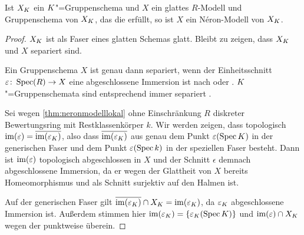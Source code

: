 \begin{Lemma}\label{nerongruppenschemaglatt}
  Ist $X_{K}$ ein $K$"=Gruppenschema und $X$ ein
  glattes $R$-Modell und Gruppenschema von $X_{K}$, das die
  \NAbbEig erfüllt, so ist $X$ ein Néron-Modell von $X_{K}$.
  \begin{proof}
    $X_{K}$ ist als Faser eines glatten Schemas glatt. Bleibt zu
    zeigen, dass $X_{K}$ und $X$ separiert sind.
    
    Ein Gruppenschema $X$ ist genau dann separiert, wenn der
    Einheitsschnitt ${\varepsilon\colon\operatorname{Spec}(R)\to X}$ eine abgeschlossene
    Immersion ist nach
    \cite[Lemma 38.6.1]{stacksproject} oder \cite[7.1, Lemma 2]{neron}.
    $K$"=Gruppenschemata sind entsprechend immer separiert
    \cite[Lemma 38.7.3]{stacksproject}. 

    Sei wegen \ref{thm:neronmodelllokal} ohne Einschränkung $R$ diskreter
    Bewertungsring mit Restklassenkörper $k$.    
    Wir werden zeigen, dass topologisch
    $\operatorname{im}(\varepsilon)=\overline{\operatorname{im}(\varepsilon_{K})}$,
    also dass $\overline{\operatorname{im}(\varepsilon_{K})}$ aus genau dem Punkt
    $\varepsilon(\operatorname{Spec}K)$ in der generischen Faser und dem Punkt
    $\varepsilon(\operatorname{Spec} k)$ in der speziellen Faser besteht.
    Dann ist $\operatorname{im}(\varepsilon)$ topologisch abgeschlossen in $X$ und der
    Schnitt $\epsilon$ demnach abgeschlossene Immersion, da er
    wegen der Glattheit von $X$ bereits Homeomorphismus und als
    Schnitt surjektiv auf den Halmen ist.
    
    Auf der generischen Faser gilt
    $\overline{\operatorname{im}(\varepsilon_{K})}\cap X_{K}=\operatorname{im}(\varepsilon_{K})$,
    da $\varepsilon_{K}$ abgeschlossene Immersion ist.
    Außerdem stimmen hier $\operatorname{im}(\varepsilon_{K})=\{\varepsilon_{K}(\operatorname{Spec}K)\}$
    und $\operatorname{im}(\varepsilon)\cap X_{K}$ wegen der \NAbbEig punktweise
    überein.


\end{proof}
\end{Lemma}
